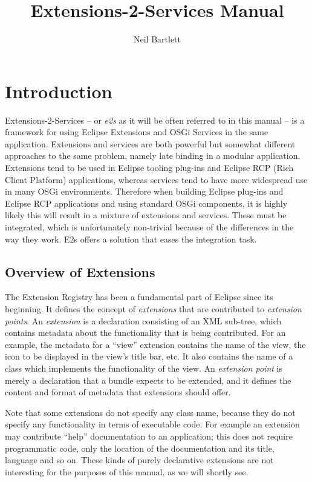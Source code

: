 \documentclass[12pt]{article}
\title{Extensions-2-Services Manual}
\author{Neil Bartlett}
\begin{document}
\maketitle
\tableofcontents

\section{Introduction}

Extensions-2-Services -- or \emph{e2s} as it will be often referred to in this manual -- is a framework for using Eclipse Extensions and OSGi Services in the same application. Extensions and services are both powerful but somewhat different approaches to the same problem, namely late binding in a modular application. Extensions tend to be used in Eclipse tooling plug-ins and Eclipse RCP (Rich Client Platform) applications, whereas services tend to have more widespread use in many OSGi environments.
Therefore when building Eclipse plug-ins and Eclipse RCP applications and using standard OSGi components, it is highly likely this will result in a mixture of extensions and services. These must be integrated, which is unfortunately non-trivial because of the differences in the way they work. E2s offers a solution that eases the integration task.

\subsection{Overview of Extensions}

The Extension Registry has been a fundamental part of Eclipse since its beginning. It defines the concept of \emph{extensions} that are contributed to \emph{extension points}. An \emph{extension} is a declaration consisting of an XML sub-tree, which contains metadata about the functionality that is being contributed. For an example, the metadata for a ``view'' extension contains the name of the view, the icon to be displayed in the view's title bar, etc. It also contains the name of a class which implements the functionality of the view. An \emph{extension point} is merely a declaration that a bundle expects to be extended, and it defines the content and format of metadata that extensions should offer.

Note that some extensions do not specify any class name, because they do not specify any functionality in terms of executable code. For example an extension may contribute ``help'' documentation to an application; this does not require programmatic code, only the location of the documentation and its title, language and so on. These kinds of purely declarative extensions are not interesting for the purposes of this manual, as we will shortly see.
\end{document}
